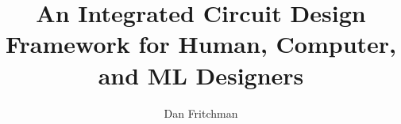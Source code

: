 \documentclass{ucbthesis} %
\begin{document}
\title{An Integrated Circuit Design Framework for Human, Computer, and ML Designers}
\author{Dan Fritchman}

\maketitle
\copyrightpage

\begin{abstract}
\begin{markdown}
\end{markdown}
\end{abstract}

\begin{frontmatter}


\tableofcontents
\clearpage
\listoffigures
\clearpage
\listoftables

\begin{acknowledgements}
\begin{markdown}
\end{markdown}
\end{acknowledgements}

\end{frontmatter}

\pagestyle{headings}

\begin{markdown}
\end{markdown}

\printbibliography
\end{document}
